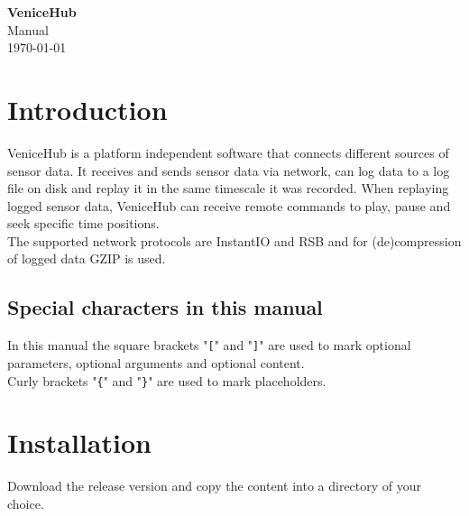 \documentclass[german,a4paper]{article}
\begin{document}

\begin{titlepage}
\vspace*{5cm}  
\begin{center}
{\LARGE\bfseries VeniceHub}\\[1.0ex]
{\Large Manual\\[1.0ex]
\today
}
\end{center}

\end{titlepage}



\tableofcontents
\newpage

\section{Introduction}

VeniceHub is a platform independent software that connects different sources of sensor data. It receives and sends sensor data via network, can log data to a log file on disk and replay it in the same timescale it was recorded. When replaying logged sensor data, VeniceHub can receive remote commands to play, pause and seek specific time positions.\\
The supported network protocols are InstantIO and RSB and for (de)compression of logged data GZIP is used.\\

\subsection{Special characters in this manual}
In this manual the square brackets "\texttt{[}" and "\texttt{]}" are used to mark optional parameters, optional arguments and optional content.\\
Curly brackets "\texttt{\{}" and "\texttt{\}}" are used to mark placeholders.

\section{Installation}
Download the release version and copy the content into a directory of your choice.
\end{document}
